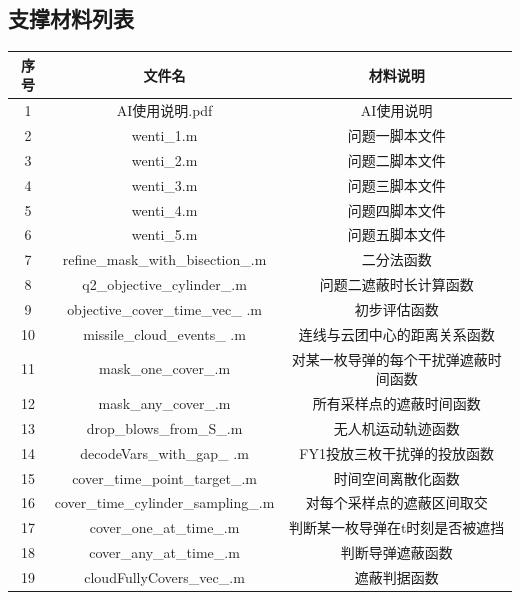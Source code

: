 \documentclass[withoutpreface]{cumcmthesis}
\begin{document}
\begin{appendices}
    \section{支撑材料列表}
    \begin{table}[htbp]
    \centering
    \begin{tabular}{ccc}
        \toprule
        序号 & 文件名                & 材料说明             \\
        \midrule
        1    &AI使用说明.pdf          &AI使用说明           \\
        2    & wenti\_1.m               &问题一脚本文件                    \\
        3    & wenti\_2.m              &问题二脚本文件                    \\
        4    &wenti\_3.m              &问题三脚本文件                      \\
        5    &wenti\_4.m              &问题四脚本文件                      \\
        6    &wenti\_5.m              &问题五脚本文件                      \\
        7    &refine\_mask\_with\_bisection\_.m&二分法函数                    \\
        8    &q2\_objective\_cylinder\_.m &问题二遮蔽时长计算函数                    \\
        9&objective\_cover\_time\_vec\_ .m&初步评估函数\\
        10&missile\_cloud\_events\_ .m&连线与云团中心的距离关系函数 \\
        11&mask\_one\_cover\_.m&对某一枚导弹的每个干扰弹遮蔽时间函数 \\
        12&mask\_any\_cover\_.m&所有采样点的遮蔽时间函数 \\
        13&drop\_blows\_from\_S\_.m& 无人机运动轨迹函数 \\
        14& decodeVars\_with\_gap\_ .m&FY1投放三枚干扰弹的投放函数 \\
        15&cover\_time\_point\_target\_.m&时间空间离散化函数\\
        16&cover\_time\_cylinder\_sampling\_.m&对每个采样点的遮蔽区间取交 \\
        17& cover\_one\_at\_time\_.m& 判断某一枚导弹在t时刻是否被遮挡 \\
        18&cover\_any\_at\_time\_.m& 判断导弹遮蔽函数\\
        19& cloudFullyCovers\_vec\_.m& 遮蔽判据函数 \\
        \bottomrule
    \end{tabular}
    \end{table}

\end{appendices}
\end{document}
